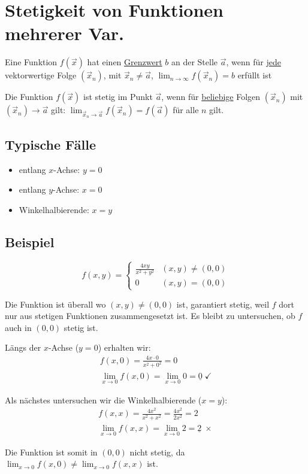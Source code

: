 \section{Stetigkeit von Funktionen mehrerer Var.}
\begin{definition}[Grenzwert]
Eine Funktion $f(\vec{x})$ hat einen \underline{Grenzwert} $b$ an der Stelle
$\vec{a}$, wenn für \underline{jede} vektorwertige Folge $(\vec{x}_n)$,
mit $\vec{x}_n \neq \vec{a}$, $\lim_{n \to \infty}f(\vec{x}_n) = b$ erfüllt ist
\end{definition}
\begin{definition}[Stetigkeit]
Die Funktion $f(\vec{x})$ ist stetig im Punkt $\vec{a}$, wenn für
\underline{beliebige} Folgen $(\vec{x}_n)$ mit
$(\vec{x}_n) \to \vec{a}$ gilt: $\lim_{\vec{x}_n \to \vec{a}} f(\vec{x}_n) = f(\vec{a})$
für alle $n$ gilt.
\end{definition}

\subsection{Typische Fälle}
\begin{itemize}
	\item entlang $x$-Achse: $y = 0$
	\item entlang $y$-Achse: $x = 0$
	\item Winkelhalbierende: $x = y$
\end{itemize}

\subsection*{Beispiel}
\[
f(x, y) = \begin{cases}
	\frac{4xy}{x^2 + y^2} & (x,y) \neq (0,0)\\
	0 & (x,y) = (0,0)
\end{cases}
\]

Die Funktion ist überall wo $(x, y) \neq (0,0)$ ist, garantiert stetig, weil $f$ dort nur aus stetigen Funktionen zusammengesetzt ist. Es bleibt zu untersuchen, ob $f$ auch in $(0,0)$ stetig ist.

Längs der $x$-Achse ($y = 0$) erhalten wir:
\begin{align*}
f(x, 0) = \frac{4x \cdot 0}{x^2 + 0^2} = 0\\
\lim_{x \to 0} f(x, 0) = \lim_{x \to 0} 0 = \underline{0} \; \checkmark
\end{align*}

Als nächstes untersuchen wir die Winkelhalbierende ($x = y$):
\begin{align*}
f(x, x) = \frac{4x^2}{x^2 + x^2} = \frac{4x^2}{2x^2} = 2\\
\lim_{x \to 0} f(x, x) = \lim_{x \to 0} 2 = \underline{2} \; \times
\end{align*}

Die Funktion ist somit in $(0,0)$ nicht stetig, da
$\lim_{x \to 0} f(x, 0) \neq \lim_{x \to 0} f(x, x)$ ist.
